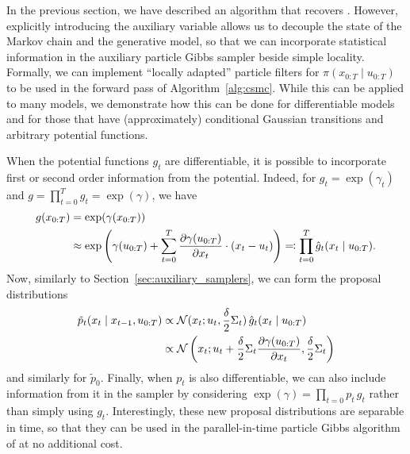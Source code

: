 In the previous section, we have described an algorithm that recovers \citet[Algorithm 3 and extensions]{finke2021csmc}. However, explicitly introducing the auxiliary variable allows us to decouple the state of the Markov chain and the generative model, so that we can incorporate statistical information in the auxiliary particle Gibbs sampler beside simple locality. Formally, we can implement ``locally adapted'' particle filters for $\pi(x_{0:T} \mid u_{0:T})$ to be used in the forward pass of Algorithm~\ref{alg:csmc}. While this can be applied to many models, we demonstrate how this can be done for differentiable models and for those that have (approximately) conditional Gaussian transitions and arbitrary potential functions.

When the potential functions $g_t$ are differentiable, it is possible to incorporate first or second order information from the potential. Indeed, for $g_t = \exp(\gamma_t)$ and $g = \prod_{t=0}^T g_t = \exp(\gamma)$, we have
\begin{equation}
    \begin{split}
        g(x_{0:T}) &= \exp(\gamma(x_{0:T}))\\
        &\approx \exp\left(\gamma(u_{0:T}) + \sum_{t=0}^T\pdv{\gamma(u_{0:T})}{x_t}\cdot (x_t - u_t)\right) \eqqcolon \prod_{t=0}^T \hat{g}_t(x_t \mid u_{0:T}).
    \end{split}
\end{equation}
Now, similarly to Section~\ref{sec:auxiliary_samplers}, we can form the proposal distributions
\begin{equation}
    \label{eq:differentiable-model}
    \begin{split}
        \tilde{p}_t(x_t \mid x_{t-1}, u_{0:T})
        &\propto \mathcal{N}(x_t; u_t, \frac{\delta}{2} \Sigma_t) \, \hat{g}_t(x_t \mid u_{0:T})\\
        &\propto \mathcal{N}\left(x_t; u_t + \frac{\delta}{2} \Sigma_t \pdv{\gamma(u_{0:T})}{x_t}, \frac{\delta}{2} \Sigma_t\right)
    \end{split}
\end{equation}
and similarly for $\tilde{p}_0$.
Finally, when $p_t$ is also differentiable, we can also include information from it in the sampler by considering $\exp(\gamma) = \prod_{t=0} p_t \, g_t$ rather than simply using $g_t$. Interestingly, these new proposal distributions are separable in time, so that they can be used in the parallel-in-time particle Gibbs algorithm of \citet{corenflos2022sequentialized} at no additional cost.


